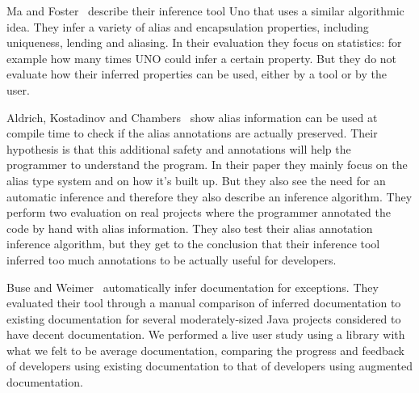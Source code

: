 Ma and Foster~\cite{Uno} describe their inference tool Uno that uses a similar
algorithmic idea. They infer a variety of alias and encapsulation
properties, including uniqueness, lending and aliasing. In their evaluation
they focus on statistics: for example how many times UNO could infer a certain property.
But they do not evaluate how their inferred properties can be used, either by a tool
or by the user.

Aldrich, Kostadinov and Chambers~\cite{AliasJava} show alias information 
can be used at compile time to check if the alias annotations are actually
preserved. Their hypothesis is that this additional safety and annotations will
help the programmer to understand the program. In their paper they mainly focus
on the alias type system and on how it's built up. But they also see the need
for an automatic inference and therefore they also describe an inference algorithm.
They perform two evaluation on real projects where the programmer
annotated the code by hand with alias information. They also test their
alias annotation inference algorithm, but they get to the conclusion that
their inference tool inferred too much annotations to be actually useful
for developers.

Buse and Weimer~\cite{autodoc} automatically infer documentation for
exceptions.  They evaluated their tool through a manual comparison of inferred documentation to
existing documentation for several moderately-sized Java projects considered to
have decent documentation.  We performed a live user study using a library with what
we felt to be average documentation, comparing the progress and feedback of
developers using existing documentation to that of developers using augmented
documentation.
